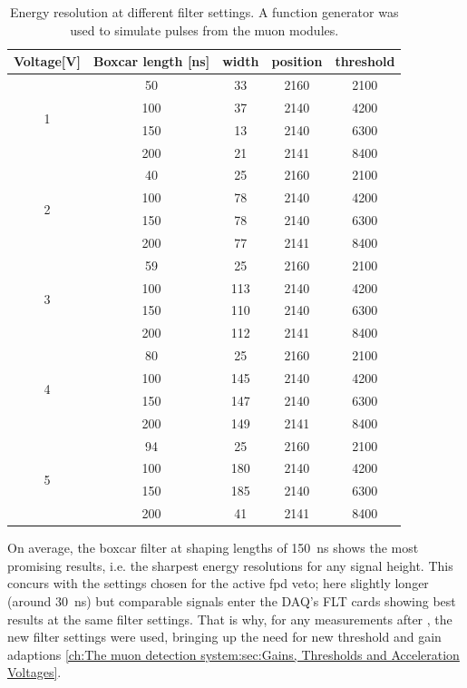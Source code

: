   \begin{table}
	\centering
  	\begin{tabular}{|c|c|c|c|c|}
  		\hline
  		Voltage[V] & Boxcar length [ns] & width & position & threshold\\
  		\hline
  		\multirow{4}{*}{1} & 50 & 33 & 2160 & 2100\\
  		 & 100 & 37 & 2140 & 4200\\
  		 & 150 & 13 & 2140 & 6300\\
  		 & 200 & 21 & 2141 & 8400\\
  		 \hline
  		 \multirow{4}{*}{2} & 40 & 25 & 2160 & 2100\\
  		 & 100 & 78 & 2140 & 4200\\
  		 & 150 & 78 & 2140 & 6300\\
  		 & 200 & 77 & 2141 & 8400\\
  		 \hline
  		 \multirow{4}{*}{3} & 59 & 25 & 2160 & 2100\\
  		 & 100 & 113 & 2140 & 4200\\
  		 & 150 & 110 & 2140 & 6300\\
  		 & 200 & 112 & 2141 & 8400\\
  		 \hline
  		 \multirow{4}{*}{4} & 80 & 25 & 2160 & 2100\\
  		 & 100 & 145 & 2140 & 4200\\
  		 & 150 & 147 & 2140 & 6300\\
  		 & 200 & 149 & 2141 & 8400\\
  		 \hline
  		 \multirow{4}{*}{5} & 94 & 25 & 2160 & 2100\\
  		 & 100 & 180 & 2140 & 4200\\
  		 & 150 & 185 & 2140 & 6300\\
  		 & 200 & 41 & 2141 & 8400\\
  		 \hline	
  	\end{tabular}
  \caption[Energy resolution dependant on filter setting]{Energy resolution at different filter settings. A function generator was used to simulate pulses from the muon modules.}
	\centering
  \end{table}
  
  On average, the boxcar filter at shaping lengths of \SI{150}{\nano\second} shows the most promising results, i.e. the sharpest energy resolutions for any signal height. This concurs with the settings chosen for the active fpd veto; here slightly longer (around \SI{30}{\nano\second}) but comparable signals enter the DAQ's FLT cards showing best results at the same filter settings\cite{KevinWierman}.
  That is why, for any measurements after , the new filter settings were used, bringing up the need for new threshold and gain adaptions \ref{ch:The muon detection system:sec:Gains, Thresholds and Acceleration Voltages}. 
  
